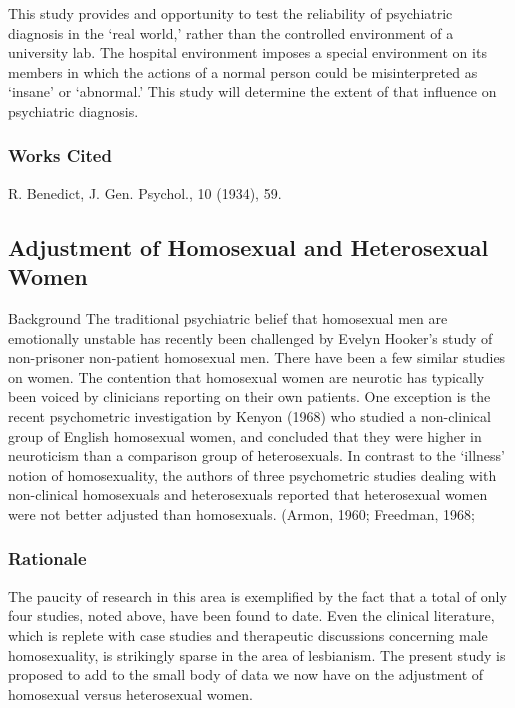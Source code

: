 This study provides and opportunity to test the reliability of psychiatric diagnosis in the `real world,' rather than the controlled environment of a university lab. The hospital environment imposes a special environment on its members in which the actions of a normal person could be misinterpreted as `insane' or `abnormal.' This study will determine the extent of that influence on psychiatric diagnosis.

\subsubsection{Works Cited}
\label{workscited}

R. Benedict, J. Gen. Psychol., 10 (1934), 59.

\subsection{Adjustment of Homosexual and Heterosexual Women}
\label{adjustmentofhomosexualandheterosexualwomen}

Background The traditional psychiatric belief that homosexual men are emotionally unstable has recently been challenged by Evelyn Hooker's study of non-prisoner non-patient homosexual men. There have been a few similar studies on women. The contention that homosexual women are neurotic has typically been voiced by clinicians reporting on their own patients. One exception is the recent psychometric investigation by Kenyon (1968) who studied a non-clinical group of English homosexual women, and concluded that they were higher in neuroticism than a comparison group of heterosexuals. In contrast to the `illness' notion of homosexuality, the authors of three psychometric studies dealing with non-clinical homosexuals and heterosexuals reported that heterosexual women were not better adjusted than homosexuals. (Armon, 1960; Freedman, 1968;

\subsubsection{Rationale}
\label{rationale}

The paucity of research in this area is exemplified by the fact that a total of only four studies, noted above, have been found to date. Even the clinical literature, which is replete with case studies and therapeutic discussions concerning male homosexuality, is strikingly sparse in the area of lesbianism. The present study is proposed to add to the small body of data we now have on the adjustment of homosexual versus heterosexual women.

